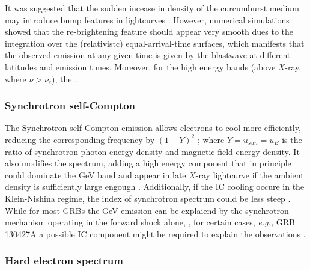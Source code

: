 It was suggested that the sudden incease in density of the curcumburst medium may introduce bump features in lightcurves \cite{Dai and Lu, 2002; Lazzati et al., 2002; Dai and Wu, 2003; Pe'er and Wijers, 2006}. However, numerical simulations \cite{Nakar et al., 2003; Nakar and Granot, 2007; Uhm and Beloborodov, 2007; Uhm and Zhang, 2014a; Geng et al., 2014)} showed that the re-brightening feature should appear very smooth dues to the integration over the (relativistc) equal-arrival-time surfaces, which manifests that the observed emission at any given time is given by the blastwave at different latitudes and emission times.
Moreover, for the high energy bands (above $X$-ray, where $\nu>\nu_c$), the  \cite{Kumar, 2000; Freedman and Waxman, 2001}.


\subsubsection{Synchrotron self-Compton}

The Synchrotron self-Compton emission allows electrons to cool more efficiently, reducing the corresponding frequency by $(1+Y)^2$ \cite{(e.g.Wei and Lu, 1998; Panaitescu and Kumar, 2000; Sari and Esin, 2001)}; where $Y = u_{sun}=u_{B}$ is the ratio of synchrotron photon energy density and magnetic field energy density. 
It also modifies the spectrum, adding a high energy component that in principle could dominate the GeV band and appear in late $X$-ray lightcurve if the ambient density is sufficiently large engough
\cite{Meszaros and Rees, 1993; Meszaros et al., 1994; Sari and Esin, 2001; Zhang and Meszaros, 2001b}.
Additionally, if the IC cooling occure in the Klein-Nishina regime, the index of synchrotron spectrum could be less steep \cite{e.g. Derishev et al., 2001; Nakar et al., 2009; Daigne et al., 2011; Barniol Duran et al., 2012}. 
While for most GRBs the GeV emission can be explaiend by the synchrotron mechanism operating in the forward shock alone, \cite{(e.g. Kumar and Barniol Duran, 2009, 2010)}, for certain cases, \textit{e.g.,} GRB 130427A \cite{Ackermann et al., 2014} a possible IC component might be required to explain the observations \cite{e.g. Fan et al., 2013a; Liu et al., 2013}.


\subsubsection{Hard electron spectrum}


